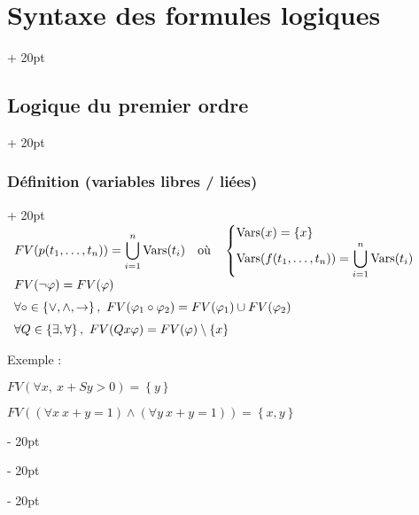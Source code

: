 \documentclass[a4paper, 12pt, twoside]{article}
\newcommand{\set}[1]{\left\{ #1 \right\}}
\newcommand{\eqsys}[2]{\begin{cases} #1 \\ #2 \end{cases}}
\newcommand{\ind}[1][20pt]{\advance\leftskip + #1}
\newcommand{\deind}[1][20pt]{\advance\leftskip - #1}
\newenvironment{indt}[2][20pt]{#2 \par \ind[#1]}{\par \deind} %
\begin{document}
\begin{indt}{\section{Syntaxe des formules logiques}}
\begin{indt}{\subsection{Logique du premier ordre}}
\begin{indt}{\subsubsection{Définition (variables libres / liées)}}
                    $
                        \begin{array}{l}
                            \displaystyle
                            FV(p(t_1, \ldots, t_n)) = \bigcup_{i = 1}^n \mathrm{Vars}(t_i) 
                            \quad
                            \text{où}
                            \quad
                            \eqsys{\mathrm{Vars}(x) = \set x}{\displaystyle \mathrm{Vars}(f(t_1, \ldots, t_n)) = \bigcup_{i = 1}^n \mathrm{Vars}(t_i)}
                            \\
                            FV(\neg \varphi) = FV(\varphi)
                            \vspace{6pt}
                            \\
                            \forall \circ \in \set{\vee, \wedge, \rightarrow},\ FV(\varphi_1 \circ \varphi_2) = FV(\varphi_1) \cup FV(\varphi_2)
                            \vspace{6pt}
                            \\
                            \forall Q \in \set{\exists, \forall},\ FV(Q x \varphi) = FV(\varphi) \setminus \set x
                        \end{array}
                    $
                
                \vspace{12pt}
                
                Exemple :
                
                $FV(\forall x,\ x + S y > 0) = \set y$
                
                \begin{center}
                \end{center}
                
                $FV((\forall x\ x + y = 1) \wedge (\forall y\ x + y = 1)) = \set{x, y}$
                

\end{indt}
\end{indt}
\end{indt}
\end{document}
